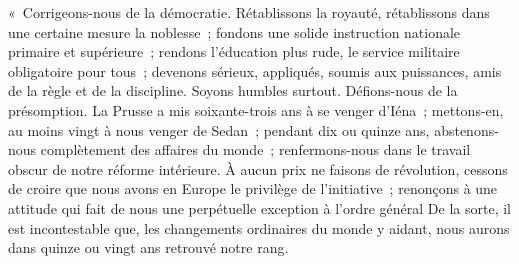 \documentclass[french,twoside]{book} %
\newenvironment{quoteblock}%
  {\begin{quoting}}
  {\end{quoting}}
\newenvironment{quotebar}{%
    \def\FrameCommand{{\color{rubric!10!}\vrule width 0.5em} \hspace{0.9em}}%
    \def\OuterFrameSep{\itemsep} %
    \MakeFramed {\advance\hsize-\width \FrameRestore}
  }%
  {%
    \endMakeFramed
  }
\renewenvironment{quoteblock}%
  {%
    \savenotes
    \setstretch{0.9}
    \normalfont
    \begin{quotebar}
  }
  {%
    \end{quotebar}
    \spewnotes
  }
\begin{document}
\begin{quoteblock}
 \noindent « Corrigeons-nous de la démocratie. Rétablissons la royauté, rétablissons dans une certaine mesure la noblesse ; fondons une solide instruction nationale primaire et supérieure ; rendons l’éducation plus rude, le service militaire obligatoire pour tous ; devenons sérieux, appliqués, soumis aux puissances, amis de la règle et de la discipline. Soyons humbles surtout. Défions-nous de la présomption. La Prusse a mis soixante-trois ans à se venger d’Iéna ; mettons-en, au moins vingt à nous venger de Sedan ; pendant dix ou quinze ans, abstenons-nous complètement des affaires du monde ; renfermons-nous dans le travail obscur de notre réforme intérieure. À aucun prix ne faisons de révolution, cessons de croire que nous avons en Europe le privilège de l’initiative ; renonçons à une attitude qui fait de nous une perpétuelle exception à l’ordre général De la sorte, il est incontestable que, les changements ordinaires du monde y aidant, nous aurons dans quinze ou vingt ans retrouvé notre rang.\par

\end{quoteblock}
\end{document}
